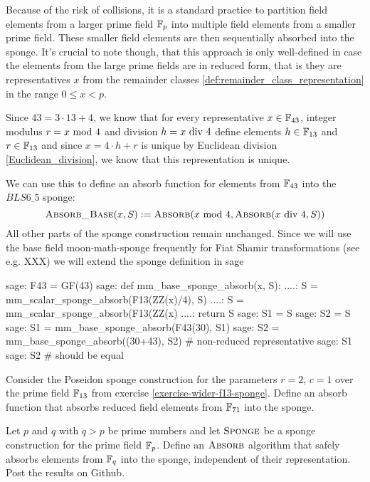 Because of the risk of collisions, it is a standard practice to partition field elements from a larger prime field $\mathbb{F}_p$ into multiple field elements from a smaller prime field. These smaller field elements are then sequentially absorbed into the sponge. It's crucial to note though, that this approach is only well-defined in case the elements from the large prime fields are in reduced form, that is they are representatives $x$ from the remainder classes \ref{def:remainder_class_representation} in the range $0\leq x < p$. 

Since $43 = 3\cdot 13 +4$, we know that for every  representative $x\in \mathbb{F}_{43}$, integer modulus $r=x \text{ mod } 4$ and division $h=x \text{ div } 4$ define elements $h\in \mathbb{F}_{13}$ and $r\in \mathbb{F}_{13}$ and since $x=4\cdot h + r$ is unique by Euclidean division \ref{Euclidean_division}, we know that this representation is unique. 

We can use this to define an absorb function for elements from $\mathbb{F}_{43}$ into the $BLS6\_5$ sponge:
\begin{equation}
\textsc{Absorb\_Base}(x,S):= \textsc{Absorb}(x \text{ mod } 4,\textsc{Absorb}(x \text{ div } 4,S))
\end{equation}
All other parts of the sponge construction remain unchanged. Since we will use the base field moon-math-sponge frequently for Fiat Shamir transformations (see e.g. XXX) we will extend the sponge definition in sage
\begin{sagecommandline}
sage: F43 = GF(43)
sage: def mm_base_sponge_absorb(x, S):
....:     S = mm_scalar_sponge_absorb(F13(ZZ(x)/4), S)
....:     S = mm_scalar_sponge_absorb(F13(ZZ(x)%
....:     return S
sage: S1 = S
sage: S2 = S
sage: S1 = mm_base_sponge_absorb(F43(30), S1)
sage: S2 = mm_base_sponge_absorb((30+43), S2) # non-reduced representative
sage: S1
sage: S2 # should be equal
\end{sagecommandline}
\begin{exercise}
Consider the Poseidon sponge construction for the parameters $r=2$, $c=1$ over the prime field $\mathbb{F}_{13}$ from exercise \ref{exercise-wider-f13-sponge}. Define an absorb function that absorbs reduced field elements from $\mathbb{F}_{71}$ into the sponge.
\end{exercise} 
\begin{exercise}
Let $p$ and $q$ with $q>p$ be prime numbers and let $\textsc{Sponge}$ be a sponge construction for the prime field $\mathbb{F}_p$. Define an $\textsc{Absorb}$ algorithm that safely absorbs elements from $\mathbb{F}_q$ into the sponge, independent of their representation. Post the results on Github.
\end{exercise}
